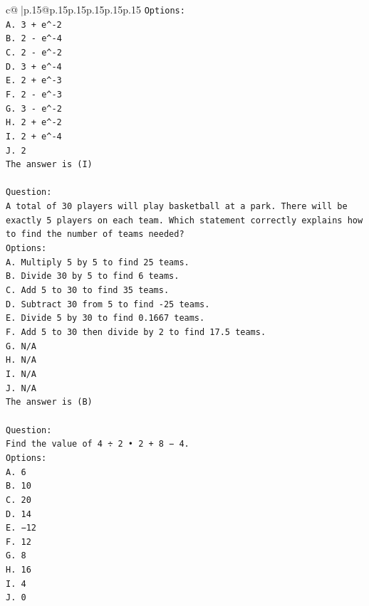 \documentclass{article}
\begin{document}
{\begin{supertabular}{c@{$\;$}|p{.15\linewidth}@{}p{.15\linewidth}p{.15\linewidth}p{.15\linewidth}p{.15\linewidth}p{.15\linewidth}}
{{{\texttt{Options:} \\
\texttt{A. 3 + e\^{}{-}2} \\
\texttt{B. 2 {-} e\^{}{-}4} \\
\texttt{C. 2 {-} e\^{}{-}2} \\
\texttt{D. 3 + e\^{}{-}4} \\
\texttt{E. 2 + e\^{}{-}3} \\
\texttt{F. 2 {-} e\^{}{-}3} \\
\texttt{G. 3 {-} e\^{}{-}2} \\
\texttt{H. 2 + e\^{}{-}2} \\
\texttt{I. 2 + e\^{}{-}4} \\
\texttt{J. 2} \\
\texttt{The answer is (I)} \\
\\ 
\texttt{Question:} \\
\texttt{A total of 30 players will play basketball at a park. There will be exactly 5 players on each team. Which statement correctly explains how to find the number of teams needed?} \\
\texttt{Options:} \\
\texttt{A. Multiply 5 by 5 to find 25 teams.} \\
\texttt{B. Divide 30 by 5 to find 6 teams.} \\
\texttt{C. Add 5 to 30 to find 35 teams.} \\
\texttt{D. Subtract 30 from 5 to find {-}25 teams.} \\
\texttt{E. Divide 5 by 30 to find 0.1667 teams.} \\
\texttt{F. Add 5 to 30 then divide by 2 to find 17.5 teams.} \\
\texttt{G. N/A} \\
\texttt{H. N/A} \\
\texttt{I. N/A} \\
\texttt{J. N/A} \\
\texttt{The answer is (B)} \\
\\ 
\texttt{Question:} \\
\texttt{Find the value of 4 ÷ 2 • 2 + 8 − 4.} \\
\texttt{Options:} \\
\texttt{A. 6} \\
\texttt{B. 10} \\
\texttt{C. 20} \\
\texttt{D. 14} \\
\texttt{E. −12} \\
\texttt{F. 12} \\
\texttt{G. 8} \\
\texttt{H. 16} \\
\texttt{I. 4} \\
\texttt{J. 0} \\
            }
        }
    }
     \\ \\


\end{supertabular}}
\end{document}
